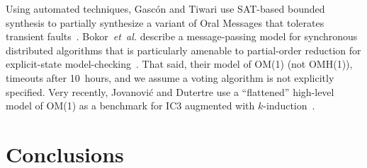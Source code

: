 \documentclass{llncs/llncs}
\newcommand{\lee}[1]{ } %
\newcommand{\lee}[1]{ {\color{blue}$<$lee: #1$>$} } %
\begin{document}
Using automated techniques, Gasc{\'{o}}n and Tiwari use SAT-based bounded synthesis to partially synthesize a variant of Oral Messages that tolerates transient faults~\cite{om1-synth}. Bokor~\emph{et~al.} describe a message-passing model for synchronous distributed algorithms that is particularly amenable to partial-order reduction for explicit-state model-checking~\cite{Bokor2010}. That said, their model of OM(1) (not OMH(1)), timeouts after 10~hours, and we assume a voting algorithm is not explicitly specified. Very recently, Jovanovi{\'{c}} and Dutertre use a ``flattened'' high-level model of OM(1) as a benchmark for IC3 augmented with $k$-induction~\cite{pdr-kind}.


\section{Conclusions}\label{sec:conclusions}

\lee{talk about compositional verification of properties, even though SAL doesn't directly support it}
\lee{talk about k-induction vs. PDR}
\lee{talk about lack of axiomatization in model-checking (multiple rushby bugs), but  tradeoff of deadlock. see proglema paper}



\end{document}
